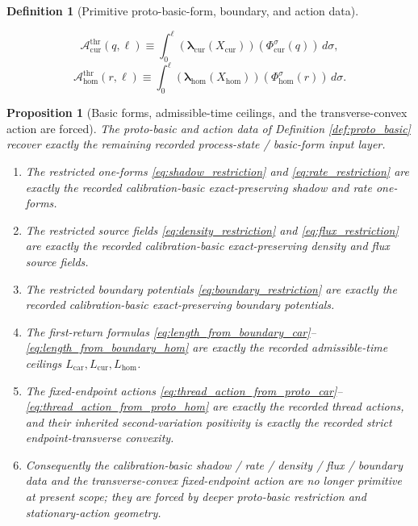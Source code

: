 \documentclass[11pt]{article}
\newcommand{\CurFlowField}{X_{\mathrm{cur}}}
\newcommand{\HomFlowField}{X_{\mathrm{hom}}}
\newcommand{\CurOrbitFlow}{\Phi_{\mathrm{cur}}}
\newcommand{\HomOrbitFlow}{\Phi_{\mathrm{hom}}}
\newcommand{\TensorProcLength}{L_{\mathrm{car}}}
\newcommand{\CurProcLength}{L_{\mathrm{cur}}}
\newcommand{\HomProcLength}{L_{\mathrm{hom}}}
\newcommand{\CurRateForm}{\boldsymbol{\lambda}_{\mathrm{cur}}}
\newcommand{\HomRateForm}{\boldsymbol{\lambda}_{\mathrm{hom}}}
\newcommand{\CurThreadAction}{\mathscr A_{\mathrm{cur}}^{\mathrm{thr}}}
\newcommand{\HomThreadAction}{\mathscr A_{\mathrm{hom}}^{\mathrm{thr}}}
\newtheorem{definition}{Definition}
\newtheorem{proposition}{Proposition}
\begin{document}
\begin{definition}[Primitive proto-basic-form, boundary, and action data]
\begin{enumerate}
\begin{equation}
    \CurThreadAction(q,\ell)
    \equiv
    \int_0^\ell \left(\CurRateForm(\CurFlowField)\right)(\CurOrbitFlow^\sigma(q))\,d\sigma,
    \label{eq:thread_action_from_proto_cur}
    \end{equation}
    \begin{equation}
    \HomThreadAction(r,\ell)
    \equiv
    \int_0^\ell \left(\HomRateForm(\HomFlowField)\right)(\HomOrbitFlow^\sigma(r))\,d\sigma.
    \label{eq:thread_action_from_proto_hom}
    \end{equation}
\end{enumerate}
\end{definition}

\begin{proposition}[Basic forms, admissible-time ceilings, and the transverse-convex action are forced]
\label{prop:basic_forced}
The proto-basic and action data of Definition \ref{def:proto_basic} recover exactly the remaining recorded process-state / basic-form input layer.
\begin{enumerate}
    \item The restricted one-forms \eqref{eq:shadow_restriction} and \eqref{eq:rate_restriction} are exactly the recorded calibration-basic exact-preserving shadow and rate one-forms.
    \item The restricted source fields \eqref{eq:density_restriction} and \eqref{eq:flux_restriction} are exactly the recorded calibration-basic exact-preserving density and flux source fields.
    \item The restricted boundary potentials \eqref{eq:boundary_restriction} are exactly the recorded calibration-basic exact-preserving boundary potentials.
    \item The first-return formulas \eqref{eq:length_from_boundary_car}--\eqref{eq:length_from_boundary_hom} are exactly the recorded admissible-time ceilings \(\TensorProcLength,\CurProcLength,\HomProcLength\).
    \item The fixed-endpoint actions \eqref{eq:thread_action_from_proto_car}--\eqref{eq:thread_action_from_proto_hom} are exactly the recorded thread actions, and their inherited second-variation positivity is exactly the recorded strict endpoint-transverse convexity.
    \item Consequently the calibration-basic shadow / rate / density / flux / boundary data and the transverse-convex fixed-endpoint action are no longer primitive at present scope; they are forced by deeper proto-basic restriction and stationary-action geometry.
\end{enumerate}
\end{proposition}
\end{document}
